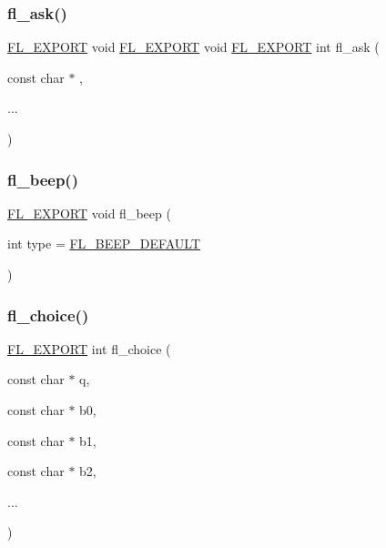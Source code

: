 \mbox{\label{fl__ask_8_h_a55f3def771c667e8c8f05c617bc410a2}} 
\subsubsection{\texorpdfstring{fl\+\_\+ask()}{fl\_ask()}}
{\footnotesize\ttfamily \hyperlink{_fl___export_8_h_aa9ba29a18aee9d738370a06eeb4470fc}{F\+L\+\_\+\+E\+X\+P\+O\+RT} void \hyperlink{_fl___export_8_h_aa9ba29a18aee9d738370a06eeb4470fc}{F\+L\+\_\+\+E\+X\+P\+O\+RT} void \hyperlink{_fl___export_8_h_aa9ba29a18aee9d738370a06eeb4470fc}{F\+L\+\_\+\+E\+X\+P\+O\+RT} int fl\+\_\+ask (\begin{DoxyParamCaption}\item[{const char $\ast$}]{,  }\item[{}]{... }\end{DoxyParamCaption})}

\mbox{\label{fl__ask_8_h_ae4ff3a9ea1901ccc58cd141569c60619}} 
\subsubsection{\texorpdfstring{fl\+\_\+beep()}{fl\_beep()}}
{\footnotesize\ttfamily \hyperlink{_fl___export_8_h_aa9ba29a18aee9d738370a06eeb4470fc}{F\+L\+\_\+\+E\+X\+P\+O\+RT} void fl\+\_\+beep (\begin{DoxyParamCaption}\item[{int}]{type = {\ttfamily \hyperlink{fl__ask_8_h_af2427850080f7b2ddc65f9a0f1e2067cadf3a64f31aaf6ba0c6b93a45da955feb}{F\+L\+\_\+\+B\+E\+E\+P\+\_\+\+D\+E\+F\+A\+U\+LT}} }\end{DoxyParamCaption})}

\mbox{\label{fl__ask_8_h_a5b69d37ffa543fe5dd617dc4277f2e1c}} 
\subsubsection{\texorpdfstring{fl\+\_\+choice()}{fl\_choice()}}
{\footnotesize\ttfamily \hyperlink{_fl___export_8_h_aa9ba29a18aee9d738370a06eeb4470fc}{F\+L\+\_\+\+E\+X\+P\+O\+RT} int fl\+\_\+choice (\begin{DoxyParamCaption}\item[{const char $\ast$}]{q,  }\item[{const char $\ast$}]{b0,  }\item[{const char $\ast$}]{b1,  }\item[{const char $\ast$}]{b2,  }\item[{}]{... }\end{DoxyParamCaption})}

